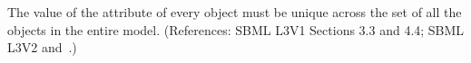 The value of the attribute  of every \UnitDefinition object must
be unique across the set of all the \UnitDefinition objects in the entire
model.  (References: SBML L3V1 Sections 3.3 and 4.4; SBML L3V2 
and~.)
